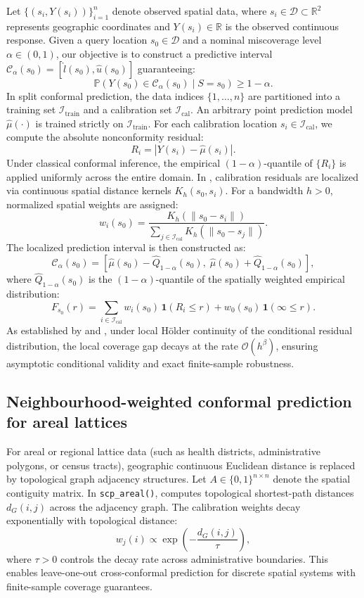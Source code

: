 Let \(\{ (s_i, Y(s_i)) \}_{i=1}^n\) denote observed spatial data, where \(s_i \in \mathcal{D} \subset \mathbb{R}^2\) represents geographic coordinates and \(Y(s_i) \in \mathbb{R}\) is the observed continuous response. Given a query location \(s_0 \in \mathcal{D}\) and a nominal miscoverage level \(\alpha \in (0, 1)\), our objective is to construct a predictive interval \(\mathcal{C}_{\alpha}(s_0) = [\hat{l}(s_0), \hat{u}(s_0)]\) guaranteeing:
\[
\mathbb{P}\left(Y(s_0) \in \mathcal{C}_{\alpha}(s_0) \mid S = s_0\right) \ge 1 - \alpha.
\]
In split conformal prediction, the data indices \(\{1, \dots, n\}\) are partitioned into a training set \(\mathcal{I}_{\text{train}}\) and a calibration set \(\mathcal{I}_{\text{cal}}\). An arbitrary point prediction model \(\hat{\mu}(\cdot)\) is trained strictly on \(\mathcal{I}_{\text{train}}\). For each calibration location \(s_i \in \mathcal{I}_{\text{cal}}\), we compute the absolute nonconformity residual:
\[
R_i = |Y(s_i) - \hat{\mu}(s_i)|.
\]
Under classical conformal inference, the empirical \((1-\alpha)\)-quantile of \(\{R_i\}\) is applied uniformly across the entire domain. In , calibration residuals are localized via continuous spatial distance kernels \(K_h(s_0, s_i)\). For a bandwidth \(h > 0\), normalized spatial weights are assigned:
\[
w_i(s_0) = \frac{K_h(\|s_0 - s_i\|)}{\sum_{j \in \mathcal{I}_{\text{cal}}} K_h(\|s_0 - s_j\|)}.
\]
The localized prediction interval is then constructed as:
\[
\mathcal{C}_{\alpha}(s_0) = \left[ \hat{\mu}(s_0) - \hat{Q}_{1-\alpha}(s_0), \; \hat{\mu}(s_0) + \hat{Q}_{1-\alpha}(s_0) \right],
\]
where \(\hat{Q}_{1-\alpha}(s_0)\) is the \((1-\alpha)\)-quantile of the spatially weighted empirical distribution:
\[
F_{s_0}(r) = \sum_{i \in \mathcal{I}_{\text{cal}}} w_i(s_0) \, \mathbf{1}(R_i \le r) + w_0(s_0) \, \mathbf{1}(\infty \le r).
\]
As established by \citet{mao2024valid} and \citet{barber2023conformal}, under local Hölder continuity of the conditional residual distribution, the local coverage gap decays at the rate \(\mathcal{O}(h^\beta)\), ensuring asymptotic conditional validity and exact finite-sample robustness.

\subsection{Neighbourhood-weighted conformal prediction for areal lattices}\label{neighbourhood-weighted-conformal-prediction-for-areal-lattices}

For areal or regional lattice data (such as health districts, administrative polygons, or census tracts), geographic continuous Euclidean distance is replaced by topological graph adjacency structures. Let \(A \in \{0, 1\}^{n \times n}\) denote the spatial contiguity matrix. In \texttt{scp\_areal()},  computes topological shortest-path distances \(d_G(i, j)\) across the adjacency graph. The calibration weights decay exponentially with topological distance:
\[
w_j(i) \propto \exp\left(-\frac{d_G(i, j)}{\tau}\right),
\]
where \(\tau > 0\) controls the decay rate across administrative boundaries. This enables leave-one-out cross-conformal prediction for discrete spatial systems with finite-sample coverage guarantees.

